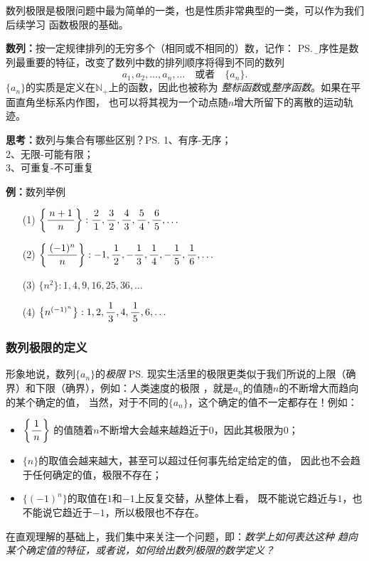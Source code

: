 数列极限是极限问题中最为简单的一类，也是性质非常典型的一类，可以作为我们后续学习
函数极限的基础。

{\bf 数列：}按一定规律排列的无穷多个（相同或不相同的）数，记作：
\ps{\b 有序性是数列最重要的特征，改变了数列中数的排列顺序将得到不同的数列}
$$a_1,a_2,\ldots,a_n,\ldots\quad\mbox{或者}\quad\{a_n\}.$$
$\{a_n\}$的实质是定义在$\mathbb{N}_+$上的函数，因此也被称为
{\it 整标函数}或{\it 整序函数}。如果在平面直角坐标系内作图，
也可以将其视为一个动点随$n$增大所留下的离散的运动轨迹。

{\bf 思考：}数列与集合有哪些区别？\ps{1、有序-无序；\\ 2、无限-可能有限；\\ 3、可重复-不可重复}

{\bf 例：}数列举例

\begin{enumerate}[(1)]
  \setlength{\itemindent}{1cm}
  \item[(1)] $\left\{\displaystyle\frac{\,{n+1}\,}{\,{n}\,}\right\}:\displaystyle\frac{\,{2}\,}{\,{1}\,},\displaystyle\frac{\,{3}\,}{\,{2}\,},\displaystyle\frac{\,{4}\,}{\,{3}\,},\displaystyle\frac{\,{5}\,}{\,{4}\,},\displaystyle\frac{\,{6}\,}{\,{5}\,},\ldots$
  \item[(2)] $\left\{\displaystyle\frac{\,{(-1)^n}\,}{\,{n}\,}\right\}:-1,\displaystyle\frac{\,{1}\,}{\,{2}\,},-\displaystyle\frac{\,{1}\,}{\,{3}\,},\displaystyle\frac{\,{1}\,}{\,{4}\,},-\displaystyle\frac{\,{1}\,}{\,{5}\,},\displaystyle\frac{\,{1}\,}{\,{6}\,},\ldots$
  \item[(3)] $\{n^2\}:1,4,9,16,25,36,\ldots$
  \item[(4)] $\left\{n^{(-1)^n}\right\}:1,2,\displaystyle\frac{\,{1}\,}{\,{3}\,},4,\displaystyle\frac{\,{1}\,}{\,{5}\,},6,\ldots$
\end{enumerate}

\subsubsection{数列极限的定义}

形象地说，数列$\{a_n\}$的{\it 极限}
\ps{现实生活里的极限更类似于我们所说的上限（确界）和下限（确界），例如：人类速度的极限}
，就是$a_n$的值随$n$的不断增大而趋向的某个确定的值，
当然，对于不同的$\{a_n\}$，这个确定的值不一定都存在！例如：
\begin{itemize}
  \item $\left\{\displaystyle\frac{\,{1}\,}{\,{n}\,}\right\}$
  的值随着$n$不断增大会越来越趋近于$0$，因此其极限为$0$；
  \item $\{n\}$的取值会越来越大，甚至可以超过任何事先给定给定的值，
  因此也不会趋于任何确定的值，极限不存在；
  \item $\{(-1)^n\}$的取值在$1$和$-1$上反复交替，从整体上看，
  既不能说它趋近与$1$，也不能说它趋近于$-1$，所以极限也不存在。
\end{itemize}

在直观理解的基础上，我们集中来关注一个问题，即：{\it 数学上如何表达这种
趋向某个确定值的特征，或者说，如何给出数列极限的数学定义？}

